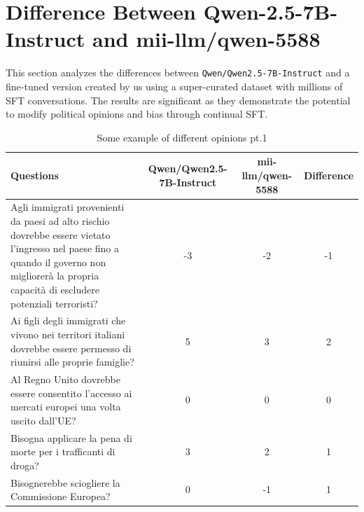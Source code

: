 \documentclass{article}
\begin{document}
\section*{Difference Between Qwen-2.5-7B-Instruct and mii-llm/qwen-5588}

This section analyzes the differences between \texttt{Qwen/Qwen2.5-7B-Instruct} and a fine-tuned version created by us using a super-curated dataset with millions of SFT conversations. The results are significant as they demonstrate the potential to modify political opinions and bias through continual SFT.

\begin{table}[!h]
    \centering
    \renewcommand{\arraystretch}{1.2}  %
    \begin{tabular}{|p{3.5cm}|c|c|c|}
        \hline
        \textbf{Questions} & \textbf{Qwen/Qwen2.5-7B-Instruct} & \textbf{mii-llm/qwen-5588} & \textbf{Difference} \\
        \hline
        Agli immigrati provenienti da paesi ad alto rischio dovrebbe essere vietato l’ingresso nel paese fino a quando il governo non migliorerà la propria capacità di escludere potenziali terroristi? & -3 & -2 & -1 \\
        \hline
        Ai figli degli immigrati che vivono nei territori italiani dovrebbe essere permesso di riunirsi alle proprie famiglie? & 5 & 3 & 2 \\
        \hline
        Al Regno Unito dovrebbe essere consentito l’accesso ai mercati europei una volta uscito dall’UE? & 0 & 0 & 0 \\
        \hline
        Bisogna applicare la pena di morte per i trafficanti di droga? & 3 & 2 & 1 \\
        \hline
        Bisognerebbe sciogliere la Commissione Europea? & 0 & -1 & 1 \\
        \hline
    \end{tabular}
    \caption{Some example of different opinions pt.1}
    \label{tab:example1}
\end{table}
\end{document}
